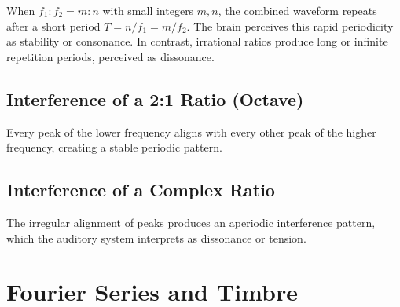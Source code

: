 \documentclass[11pt]{article}
\theoremstyle{definition}
\begin{document}
When $f_1 : f_2 = m : n$ with small integers $m, n$, the combined waveform repeats after a short period $T = n/f_1 = m/f_2$. The brain perceives this rapid periodicity as stability or consonance. In contrast, irrational ratios produce long or infinite repetition periods, perceived as dissonance.

\subsection{Interference of a 2:1 Ratio (Octave)}

\begin{center}
\end{center}

Every peak of the lower frequency aligns with every other peak of the higher frequency, creating a stable periodic pattern.

\subsection{Interference of a Complex Ratio}

\begin{center}
\end{center}

The irregular alignment of peaks produces an aperiodic interference pattern, which the auditory system interprets as dissonance or tension.

\section{Fourier Series and Timbre}
\end{document}
